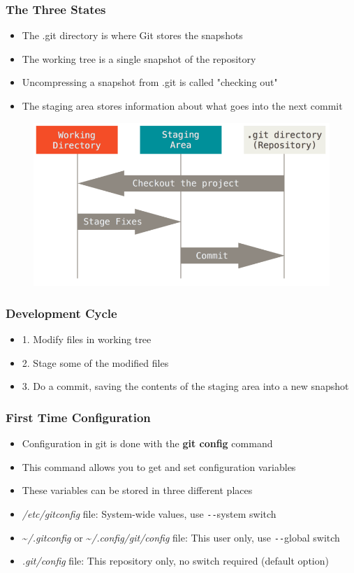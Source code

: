 \documentclass{beamer}
\begin{document}
\begin{frame}
	\frametitle{The Three States}
	\begin{itemize}
		\item{The .git directory is where Git stores the snapshots}
		\item{The working tree is a single snapshot of the repository}
		\item{Uncompressing a snapshot from .git is called "checking out"}
		\item{The staging area stores information about what goes into the next commit}
	\end{itemize}
	\begin{figure}
		\includegraphics[scale=0.25]{The_Three_States-0.png}
	\end{figure}

\end{frame}

\begin{frame}
	\frametitle{Development Cycle}
	\begin{itemize}
		\item{1. Modify files in working tree}
		\item{2. Stage some of the modified files}
		\item{3. Do a commit, saving the contents of the staging area into a new snapshot}
	\end{itemize}
\end{frame}

\begin{frame}
	\frametitle{First Time Configuration}
	\begin{itemize}
		\item{Configuration in git is done with the \textbf{git config} command}
		\item{This command allows you to get and set configuration variables}
		\item{These variables can be stored in three different places}
		\item{\textit{/etc/gitconfig} file: System-wide values, use \texttt{-{}-}system switch}
		\item{\textasciitilde{}\textit{/.gitconfig} or \textasciitilde{}\textit{/.config/git/config} file: This user only, use \texttt{-{}-}global switch}
		\item{\textit{.git/config} file: This repository only, no switch required (default option)}
	\end{itemize}
\end{frame}
\end{document}
